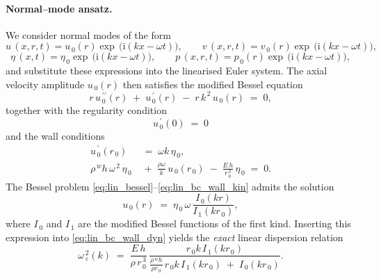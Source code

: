 \documentclass[alpha-refs, 12pt]{wiley-article}
\newcommand{\ui}{\mathrm{i}}
\newcommand{\eps}{\varepsilon}
\begin{document}
\paragraph{Normal–mode ansatz.} We consider normal modes of the form
\begin{equation*}
  u\,\left(x,r,t\right)=u_{\,0}\left(r\right)\exp\,\bigl(\ui\left(kx-\omega t\right)\bigr),\qquad
  v\,\left(x,r,t\right)=v_{\,0}\left(r\right)\exp\,\bigl(\ui\left(kx-\omega t\right)\bigr),
\end{equation*}
\begin{equation*}
  \eta\,\left(x,t\right)=\eta_{\,0}\exp\,\bigl(\ui\left(kx-\omega t\right)\bigr),\qquad
  p\,\left(x,r,t\right)=p_{\,0}\left(r\right)\exp\,\bigl(\ui\left(kx-\omega t\right)\bigr),
\end{equation*}
and substitute these expressions into the linearised Euler system. The axial velocity amplitude $u_{\,0}\left(r\right)$ then satisfies the modified Bessel equation
\begin{equation}\label{eq:lin_bessel}
  r\,u_{\,0}^{\,\prime\prime}\left(r\right)\;+\;u_{\,0}^{\,\prime}\left(r\right)\;-\;r\,k^{\,2}\,
  u_{\,0}\left(r\right)\;=\;0,
\end{equation}
together with the regularity condition
\begin{equation}\label{eq:lin_bc_centre}
  u_{\,0}^{\,\prime}\left(0\right)\;=\;0
\end{equation}
and the wall conditions
\begin{align}
  u_{\,0}^{\,\prime}\left(r_{\,0}\right) & \;=\;\omega k\,\eta_{\,0}, \label{eq:lin_bc_wall_kin}\\
  \rho^{\,w}h\,\omega^{\,2}\,\eta_{\,0} & \;+\;\frac{\rho\omega}{k}\,u_{\,0}\left(r_{\,0}\right)
  \;-\;\frac{E\,h}{r_{\,0}^{\,2}}\,\eta_{\,0}\;=\;0.
  \label{eq:lin_bc_wall_dyn}
\end{align}
The Bessel problem \eqref{eq:lin_bessel}--\eqref{eq:lin_bc_wall_kin} admits the solution
\[
  u_{\,0}\left(r\right)\;=\;\eta_{\,0}\,\omega\,
  \frac{I_{\,0}\left(kr\right)}{I_{\,1}\left(kr_{\,0}\right)},
\]
where $I_{\,0}$ and $I_{\,1}$ are the modified Bessel functions of the first kind.  Inserting this expression into \eqref{eq:lin_bc_wall_dyn} yields the \emph{exact} linear dispersion relation
\begin{equation}\label{eq:disp_euler}
  \omega_{\,\eps}^{\,2}\left(k\right)\;=\;
  \frac{E\,h}{\rho\,r_{\,0}^{\,3}}\,
  \frac{r_{\,0}k\,I_{\,1}\left(kr_{\,0}\right)}
       {\displaystyle\frac{\rho^{\,w}h}{\rho r_{\,0}}\,
       r_{\,0}k\,I_{\,1}\left(kr_{\,0}\right)\;+\;I_{\,0}\left(kr_{\,0}\right)}.
\end{equation}
\end{document}
